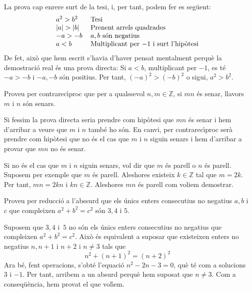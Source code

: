\begin{solucio}
La prova cap enrere surt de la tesi, i, per tant, podem fer es seg\"{u}ent:%
\[%
\begin{tabular}
[c]{ll}%
$a^{2}>b^{2}$ & Tesi\\
$\left\vert a\right\vert >\left\vert b\right\vert $ & Prenent arrels
quadrades\\
$-a>-b$ & $a,b$ s\'{o}n negatius\\
$a<b$ & Multiplicant per $-1$ i surt l'hip\`{o}tesi
\end{tabular}
\]
De fet, aix\`{o} que hem escrit s'havia d'haver pensat mentalment perqu\`{e}
la demostraci\'{o} real \'{e}s una prova directa: Si $a<b$, multiplicant per
$-1$, es t\'{e} $-a>-b$ i $-a,-b$ s\'{o}n positius. Per tant, $\left(
-a\right)  ^{2}>(-b)^{2}$ o sigui, $a^{2}>b^{2}$.
\end{solucio}

\begin{exercici}
Proveu per contrarec\'{\i}proc que per a qualssevol $n,m\in\mathbb{Z}$, si
$mn$ \'{e}s senar, llavors $m$ i $n$ s\'{o}n senars.
\end{exercici}

\begin{solucio}
Si fessim la prova directa seria prendre com hip\`{o}tesi que $mn$ \'{e}s
senar i hem d'arribar a veure que $m$ i $n$ tamb\'{e} ho s\'{o}n. En canvi,
per contrarec\'{\i}proc ser\`{a} prendre com hip\`{o}tesi que no \'{e}s el cas
que $m$ i $n$ siguin senars i hem d'arribar a provar que $mn$ no \'{e}s senar.

Si no \'{e}s el cas que $m$ i $n$ siguin senars, vol dir que $m$ \'{e}s parell
o $n$ \'{e}s parell. Suposem per exemple que $m$ \'{e}s parell. Aleshores
existeix $k\in\mathbb{Z}$ tal que $m=2k$. Per tant, $mn=2kn$ i $kn\in
\mathbb{Z}$. Aleshores $mn$ \'{e}s parell com voliem demostrar.
\end{solucio}

\begin{exercici}
Proveu per reducci\'{o} a l'abssurd que els \'{u}nics enters consecutius no
negatius $a,b$ i $c$ que compleixen $a^{2}+b^{2}=c^{2}$ s\'{o}n $3,4$ i $5$.
\end{exercici}

\begin{solucio}
Suposem que $3,4$ i~$5$ no s\'{o}n els \'{u}nics enters consecutius no
negatius que compleixen $a^{2}+b^{2}=c^{2}$. Aix\`{o} \'{e}s equivalent a
suposar que existeixen enters no negatius $n,n+1$ i $n+2$ i $n\neq3$ tals que%
\[
n^{2}+(n+1)^{2}=(n+2)^{2}%
\]
Ara b\'{e}, fent operacions, s'obt\'{e} l'equaci\'{o} $n^{2}-2n-3=0$, qu\`{e}
t\'{e} com a solucions $3$ i $-1$. Per tant, arribem a un absurd perqu\`{e}
hem suposat que $n\neq3$. Com a conseq\"{u}\`{e}ncia, hem provat el que vol\'{\i}em.
\end{solucio}

